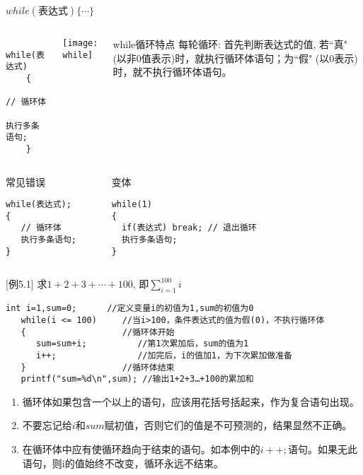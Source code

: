 \begin{frame}{$while(\text{表达式})\{ \cdots\}$}
\vspace{-0.5cm}
\begin{columns}[T]
	\begin{lstlisting} 
    while(表达式)   
    {
       // 循环体
       执行多条语句;  
    }   
    \end{lstlisting}
	\texttt{[image: while]}
	\small
	\begin{block}{while循环特点}
		\small
		每轮循环: 首先判断表达式的值, 若``真" (以非0值表示)时，就执行循环体语句；为``假" (以0表示)时，就不执行循环体语句。
	\end{block}
\end{columns}
\vspace{-0.4cm}
\begin{columns}
\begin{block}{常见错误}
\begin{lstlisting} 
while(表达式); 
{
   // 循环体
   执行多条语句;    
}
\end{lstlisting}
\end{block}
\begin{block}{变体}
\begin{lstlisting} 
while(1)  
{
  if(表达式) break; // 退出循环
  执行多条语句;    
}
\end{lstlisting}
\end{block}
\end{columns}
\end{frame}

\begin{frame}
$[$例5.1$]$ 求$1+2+3+\cdots+100$, 即$\sum\limits_{i=1}^{100}i$
\medskip
\begin{lstlisting}[frame=lines]
   int i=1,sum=0;      //定义变量i的初值为1,sum的初值为0  
   while(i <= 100)     //当i>100，条件表达式的值为假(0)，不执行循环体
   {                   //循环体开始
      sum=sum+i;          //第1次累加后，sum的值为1
      i++;                //加完后，i的值加1，为下次累加做准备
   }                   //循环体结束
   printf("sum=%d\n",sum); //输出1+2+3…+100的累加和                
\end{lstlisting}
\begin{enumerate}
	\setlength{\itemsep}{.2cm}
	\item 循环体如果包含一个以上的语句，应该用花括号括起来，作为复合语句出现。
	\item 不要忘记给$i$和$sum$赋初值，否则它们的值是不可预测的，结果显然不正确。
	\item 在循环体中应有使循环趋向于结束的语句。如本例中的$i++;$语句。如果无此语句，则i的值始终不改变，循环永远不结束。
\end{enumerate}
\end{frame}

